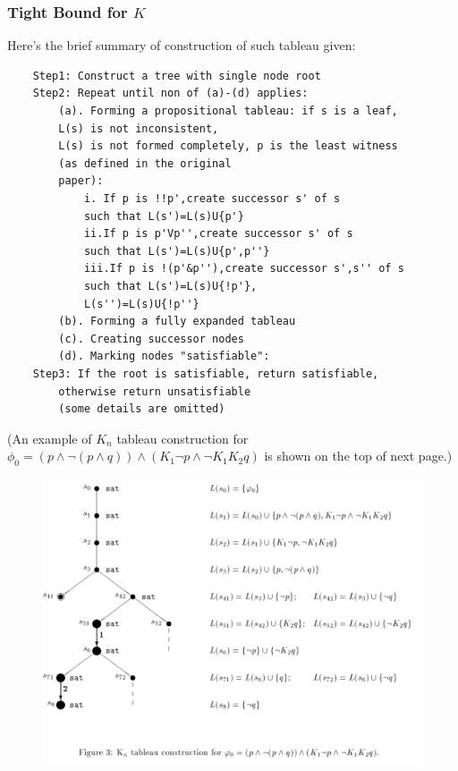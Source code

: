 \documentclass{article}
\begin{document}
\subsubsection{Tight Bound for $K$}
\par Here's the brief summary of construction of such tableau given:
\begin{verbatim}
    Step1: Construct a tree with single node root
    Step2: Repeat until non of (a)-(d) applies:
        (a). Forming a propositional tableau: if s is a leaf, 
        L(s) is not inconsistent, 
        L(s) is not formed completely, p is the least witness 
        (as defined in the original 
        paper):
            i. If p is !!p',create successor s' of s 
            such that L(s')=L(s)U{p'}
            ii.If p is p'Vp'',create successor s' of s 
            such that L(s')=L(s)U{p',p''}
            iii.If p is !(p'&p''),create successor s',s'' of s 
            such that L(s')=L(s)U{!p'},
            L(s'')=L(s)U{!p''}
        (b). Forming a fully expanded tableau
        (c). Creating successor nodes
        (d). Marking nodes "satisfiable": 
    Step3: If the root is satisfiable, return satisfiable,
        otherwise return unsatisfiable
        (some details are omitted)
\end{verbatim}
\par (An example of $K_n$ tableau construction for $\phi_0 = (p\land \lnot(p\land q))\land (K_1\lnot p \land \lnot K_1K_2q)$ is shown on the top of next page.)
\begin{figure}[h]
    \includegraphics[scale=1]{EXAMPLE.png}
\end{figure}
\end{document}
